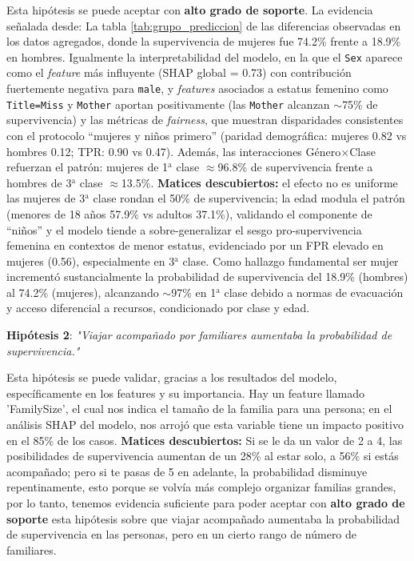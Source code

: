 \documentclass[conference]{IEEEtran}
\begin{document}
Esta hipótesis se puede aceptar con \textbf{alto grado de soporte}. La evidencia señalada desde: La tabla \ref{tab:grupo_prediccion}  de las diferencias observadas en los datos agregados, donde la supervivencia de mujeres fue 74.2\% frente a 18.9\% en hombres. Igualmente la interpretabilidad del modelo, en la que el \texttt{Sex} aparece como el \emph{feature} más influyente (SHAP global = 0.73) con contribución fuertemente negativa para \texttt{male}, y \emph{features} asociados a estatus femenino como \texttt{Title=Miss} y \texttt{Mother} aportan positivamente (las \texttt{Mother} alcanzan $\sim$75\% de supervivencia) y las métricas de \emph{fairness}, que muestran disparidades consistentes con el protocolo ``mujeres y niños primero'' (paridad demográfica: mujeres 0.82 vs hombres 0.12; TPR: 0.90 vs 0.47). Además, las interacciones Género$\times$Clase refuerzan el patrón: mujeres de 1$^{\mathrm{a}}$ clase $\approx$96.8\% de supervivencia frente a hombres de 3$^{\mathrm{a}}$ clase $\approx$13.5\%. \textbf{Matices descubiertos:} el efecto no es uniforme las mujeres de 3$^{\mathrm{a}}$ clase rondan el 50\% de supervivencia; la edad modula el patrón (menores de 18 años 57.9\% vs adultos 37.1\%), validando el componente de ``niños'' y el modelo tiende a sobre-generalizar el sesgo pro-supervivencia femenina en contextos de menor estatus, evidenciado por un FPR elevado en mujeres (0.56), especialmente en 3$^{\mathrm{a}}$ clase. Como hallazgo fundamental ser mujer incrementó sustancialmente la probabilidad de supervivencia del 18.9\% (hombres) al 74.2\% (mujeres), alcanzando $\sim$97\% en 1$^{\mathrm{a}}$ clase debido a normas de evacuación y acceso diferencial a recursos, condicionado por clase y edad.

\vspace{.2 cm}

\textbf{Hipótesis 2}: \textit{"Viajar acompañado por familiares aumentaba la probabilidad de supervivencia."}

Esta hipótesis se puede validar, gracias a los resultados del modelo, específicamente en los features y su importancia. Hay un feature llamado 'FamilySize', el cual nos indica el tamaño de la familia para una persona; en el análisis SHAP del modelo, nos arrojó que esta variable tiene un impacto positivo en el 85\% de los casos. \textbf{Matices descubiertos:} Si se le da un valor de 2 a 4, las posibilidades de supervivencia aumentan de un 28\% al estar solo, a 56\% si estás acompañado; pero si te pasas de 5 en adelante, la probabilidad disminuye repentinamente, esto porque se volvía más complejo organizar familias grandes, por lo tanto, tenemos evidencia suficiente para poder aceptar con \textbf{alto grado de soporte} esta hipótesis sobre que viajar acompañado aumentaba la probabilidad de supervivencia en las personas, pero en un cierto rango de número de familiares.
\end{document}
